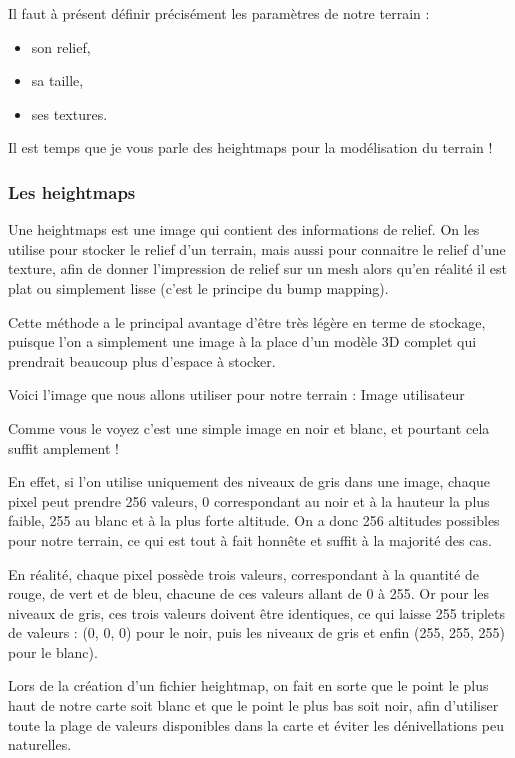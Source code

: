 \documentclass[10pt,a4paper]{report}
\begin{document}
Il faut \`a pr\'esent d\'efinir pr\'ecis\'ement les param\`etres de notre terrain :

\begin{itemize}
\item son relief, 
\item sa taille,
\item ses textures.
\end{itemize}

Il est temps que je vous parle des heightmaps pour la mod\'elisation du terrain !


\subsubsection{Les heightmaps}

Une heightmaps est une image qui contient des informations de relief. On les utilise pour stocker le relief d'un terrain, mais aussi pour connaitre le relief d'une texture, afin de donner l'impression de relief sur un mesh alors qu'en r\'ealit\'e il est plat ou simplement lisse (c'est le principe du bump mapping).

Cette m\'ethode a le principal avantage d'\^etre tr\`es l\'eg\`ere en terme de stockage, puisque l'on a simplement une image \`a la place d'un mod\`ele 3D complet qui prendrait beaucoup plus d'espace \`a stocker.

Voici l'image que nous allons utiliser pour notre terrain :
Image utilisateur

Comme vous le voyez c'est une simple image en noir et blanc, et pourtant cela suffit amplement !

En effet, si l'on utilise uniquement des niveaux de gris dans une image, chaque pixel peut prendre 256 valeurs, 0 correspondant au noir et \`a la hauteur la plus faible, 255 au blanc et \`a la plus forte altitude. On a donc 256 altitudes possibles pour notre terrain, ce qui est tout \`a fait honn\^ete et suffit \`a la majorit\'e des cas.

En r\'ealit\'e, chaque pixel poss\`ede trois valeurs, correspondant \`a la quantit\'e de rouge, de vert et de bleu, chacune de ces valeurs allant de 0 \`a 255. Or pour les niveaux de gris, ces trois valeurs doivent \^etre identiques, ce qui laisse 255 triplets de valeurs : (0, 0, 0) pour le noir, puis les niveaux de gris et enfin (255, 255, 255) pour le blanc).

Lors de la cr\'eation d'un fichier heightmap, on fait en sorte que le point le plus haut de notre carte soit blanc et que le point le plus bas soit noir, afin d'utiliser toute la plage de valeurs disponibles dans la carte et \'eviter les d\'enivellations peu naturelles.
\end{document}
